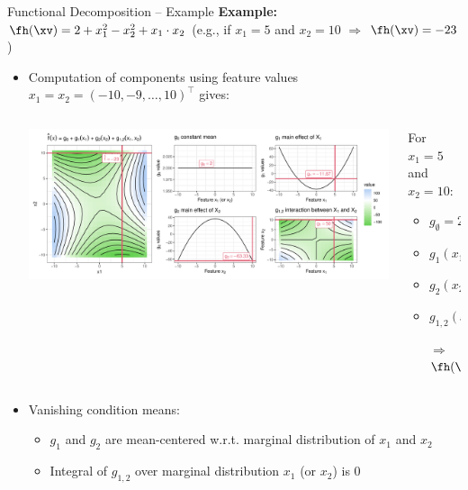 \documentclass[11pt,compress,t,notes=noshow, aspectratio=169, xcolor=table]{beamer}
\newcommand{\open}{}
\newcommand{\close}{}
\begin{document}
\begin{frame}{Functional Decomposition -- Example}
\textbf{Example:} $\fh(\xv) = 2 + x_1^2 - x_2^2 + x_1 \cdot x_2$ (e.g., if $x_1 = 5$ and $x_2 = 10$ $\Rightarrow$ $\fh(\xv) = -23$)

\begin{itemize}
    \item Computation of components using feature values $x_1 = x_2 = (-10, -9, \ldots, 10)^\top$ gives:
    \begin{columns}[c, totalwidth=\linewidth]
    \begin{column}{0.75\textwidth}
        \includegraphics[width = \textwidth]{figure/decomposition}
    \end{column}
    \begin{column}{0.25\textwidth}
    For $x_1 = 5$ and $x_2 = 10$:\\
    \begin{itemize}
        \item $g_{\open \emptyset \close} = 2$
        \item $g_{\open 1 \close}(x_1) = -9.67$
        \item $g_{\open 2 \close}(x_2) = -65.33$
        \item $g_{\open 1,2 \close}(x_1, x_2) = 50$
        \item[$\Rightarrow$] $\fh(\xv) = -23$
    \end{itemize}
    \end{column}
    \end{columns}
\pause
    \item Vanishing condition means:
    \begin{itemize}
        \item $g_1$ and $g_2$ are mean-centered w.r.t. marginal distribution of $x_1$ and $x_2$
        \item Integral of $g_{1,2}$ over marginal distribution $x_1$ (or $x_2$) is 0
    \end{itemize}
\end{itemize} 
\end{frame}
\end{document}

